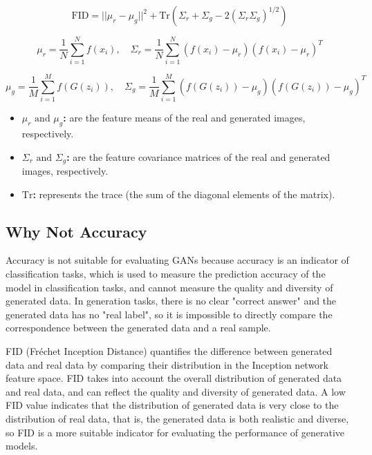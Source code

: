 \begin{equation}
    \text{FID} = || \mu_r - \mu_g ||^2 + \text{Tr}(\Sigma_r + \Sigma_g - 2(\Sigma_r \Sigma_g)^{1/2})
\end{equation}


\begin{equation}
    \mu_r = \frac{1}{N} \sum_{i=1}^{N} f(x_i), \quad \Sigma_r = \frac{1}{N} \sum_{i=1}^{N} (f(x_i) - \mu_r)(f(x_i) - \mu_r)^T
\end{equation}

\begin{equation}
    \mu_g = \frac{1}{M} \sum_{i=1}^{M} f(G(z_i)), \quad \Sigma_g = \frac{1}{M} \sum_{i=1}^{M} (f(G(z_i)) - \mu_g)(f(G(z_i)) - \mu_g)^T
\end{equation}


\begin{itemize}
    \item \textbf{ $\mu_r \text{ and } \mu_g$:}  are the feature means of the real and generated images, respectively.
    \item \textbf{$\Sigma_r \text{ and } \Sigma_g$:}  are the feature covariance matrices of the real and generated images, respectively.
    \item \textbf{ $\text{Tr}$:}  represents the trace (the sum of the diagonal elements of the matrix).
\end{itemize}


\subsection*{Why Not Accuracy}

Accuracy is not suitable for evaluating GANs because accuracy is an indicator of classification tasks, 
which is used to measure the prediction accuracy of the model in classification tasks, and cannot 
measure the quality and diversity of generated data. In generation tasks, there is no clear 
"correct answer" and the generated data has no "real label", so it is impossible to directly 
compare the correspondence between the generated data and a real sample. 

FID (Fréchet Inception Distance) quantifies the difference between generated data and real 
data by comparing their distribution in the Inception network feature space. FID takes into 
account the overall distribution of generated data and real data, and can reflect the quality 
and diversity of generated data. A low FID value indicates that the distribution of generated 
data is very close to the distribution of real data, that is, the generated data is both realistic 
and diverse, so FID is a more suitable indicator for evaluating the performance of generative models.